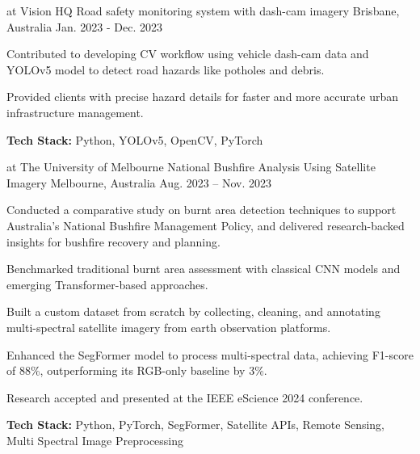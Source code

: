 \begin{cventries}
  \cventry
    {at Vision HQ} %
    {Road safety monitoring system with dash-cam imagery} %
    {Brisbane, Australia} %
    {Jan. 2023 - Dec. 2023} %
    {
      \begin{cvitems} %
        \item {Contributed to developing CV workflow using vehicle dash-cam data and YOLOv5 model to detect road hazards like potholes and debris.}
        \item {Provided clients with precise hazard details for faster and more accurate urban infrastructure management.}
        \item {\textbf{Tech Stack:} Python, YOLOv5, OpenCV, PyTorch}
      \end{cvitems}
    }

  \cventry
    {at The University of Melbourne} %
    {National Bushfire Analysis Using Satellite Imagery} %
    {Melbourne, Australia} %
    {Aug. 2023 – Nov. 2023} %
    {
      \begin{cvitems}
        \item {Conducted a comparative study on burnt area detection techniques to support Australia's National Bushfire Management Policy, and delivered research-backed insights for bushfire recovery and planning.}
        \item {Benchmarked traditional burnt area assessment with classical CNN models and emerging Transformer-based approaches.}
        \item {Built a custom dataset from scratch by collecting, cleaning, and annotating multi-spectral satellite imagery from earth observation platforms.}
        \item {Enhanced the SegFormer model to process multi-spectral data, achieving F1-score of 88\%, outperforming its RGB-only baseline by 3\%.}
        \item {Research accepted and presented at the IEEE eScience 2024 conference.}
        \item {\textbf{Tech Stack:} Python, PyTorch, SegFormer, Satellite APIs, Remote Sensing, Multi Spectral Image Preprocessing}
      \end{cvitems}
    }

\end{cventries}
